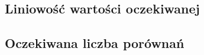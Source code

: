 {
\subsection{Liniowość wartości oczekiwanej}


\makeatletter
{}
\makeatother
\graphicspath{{../probabil}}

\let\realsection\section
\let\realsubsection\subsection
\let\section\subsection
\let\subsection\subsubsection
\let\subsubsection\paragraph

\realsubsection{Oczekiwana liczba porównań}


}


